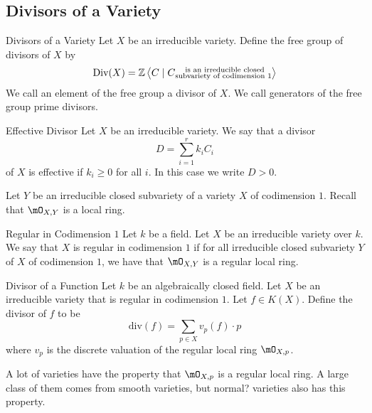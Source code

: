 \documentclass[a4paper]{article}
\begin{document}
\subsection{Divisors of a Variety}
\begin{defn}{Divisors of a Variety}{} Let $X$ be an irreducible variety. Define the free group of divisors of $X$ by $$\text{Div}(X)=\mathbb{Z}\left\langle C\;|\;C\substack{\text{ is an irreducible closed}\\\text{subvariety of codimension }1}\right\rangle$$ We call an element of the free group a divisor of $X$. We call generators of the free group prime divisors. 
\end{defn}

\begin{defn}{Effective Divisor}{} Let $X$ be an irreducible variety. We say that a divisor $$D=\sum_{i=1}^rk_iC_i$$ of $X$ is effective if $k_i\geq 0$ for all $i$. In this case we write $D>0$. 
\end{defn}

Let $Y$ be an irreducible closed subvariety of a variety $X$ of codimension $1$. Recall that $\mO_{X,Y}$ is a local ring. 

\begin{defn}{Regular in Codimension $1$}{} Let $k$ be a field. Let $X$ be an irreducible variety over $k$. We say that $X$ is regular in codimension $1$ if for all irreducible closed subvariety $Y$ of $X$ of codimension $1$, we have that $\mO_{X,Y}$ is a regular local ring. 
\end{defn}

\begin{defn}{Divisor of a Function}{} Let $k$ be an algebraically closed field. Let $X$ be an irreducible variety that is regular in codimension $1$. Let $f\in K(X)$. Define the divisor of $f$ to be $$\text{div}(f)=\sum_{p\in X}v_p(f)\cdot p$$ where $v_p$ is the discrete valuation of the regular local ring $\mO_{X,p}$. 
\end{defn}

A lot of varieties have the property that $\mO_{X,p}$ is a regular local ring. A large class of them comes from smooth varieties, but normal? varieties also has this property. 
\end{document}
